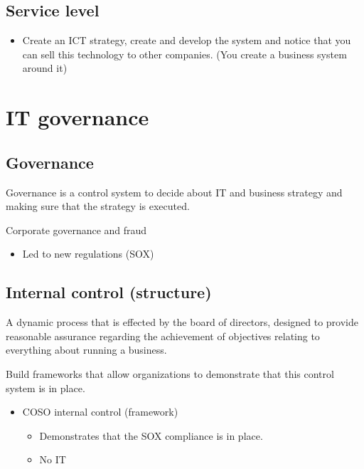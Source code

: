 \documentclass{article}
\begin{document}
\subsection{Service level}

\begin{itemize}
\item  Create an ICT strategy, create and develop the system and notice that you can sell this technology to other companies. (You create a business system around it)
\end{itemize}

\section{IT governance}

\subsection{Governance}

Governance is a control system to decide about IT and business strategy and making sure that the strategy is executed.

\hfill \newline
Corporate governance and fraud 

\begin{itemize}
\item  Led to new regulations (SOX)
\end{itemize}

\subsection{Internal control (structure)}

A dynamic process that is effected by the board of directors, designed to provide reasonable assurance regarding the achievement of objectives relating to everything about running a business.

\hfill \newline
Build frameworks that allow organizations to demonstrate that this control system is in place.

\begin{itemize}
\item  COSO internal control (framework)

\begin{itemize}
\item  Demonstrates that the SOX compliance is in place.

\item  No IT
\end{itemize}
\end{itemize}
\end{document}
